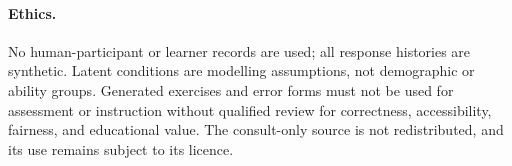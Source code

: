 \paragraph{Ethics.}
No human-participant or learner records are used; all response histories are
synthetic.  Latent conditions are modelling assumptions, not demographic or
ability groups.  Generated exercises and error forms must not be used for
assessment or instruction without qualified review for correctness,
accessibility, fairness, and educational value.  The consult-only source is not
redistributed, and its use remains subject to its licence.
